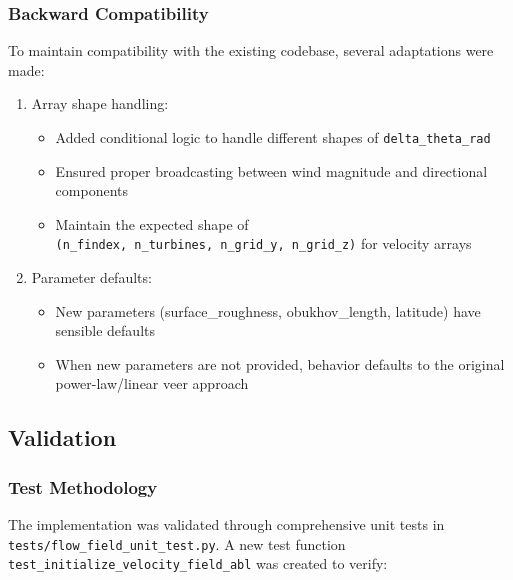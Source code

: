 \documentclass[
]{article}
\providecommand{\tightlist}{%
  \setlength{\itemsep}{0pt}\setlength{\parskip}{0pt}}
\begin{document}
\hypertarget{backward-compatibility}{%
\subsubsection{Backward Compatibility}\label{backward-compatibility}}

To maintain compatibility with the existing codebase, several
adaptations were made:

\begin{enumerate}
\def\labelenumi{\arabic{enumi}.}
\tightlist
\item
  Array shape handling:

  \begin{itemize}
  \tightlist
  \item
    Added conditional logic to handle different shapes of
    \texttt{delta\_theta\_rad}
  \item
    Ensured proper broadcasting between wind magnitude and directional
    components
  \item
    Maintain the expected shape of
    \texttt{(n\_findex,\ n\_turbines,\ n\_grid\_y,\ n\_grid\_z)} for
    velocity arrays
  \end{itemize}
\item
  Parameter defaults:

  \begin{itemize}
  \tightlist
  \item
    New parameters (surface\_roughness, obukhov\_length, latitude) have
    sensible defaults
  \item
    When new parameters are not provided, behavior defaults to the
    original power-law/linear veer approach
  \end{itemize}
\end{enumerate}

\hypertarget{validation}{%
\subsection{Validation}\label{validation}}

\hypertarget{test-methodology}{%
\subsubsection{Test Methodology}\label{test-methodology}}

The implementation was validated through comprehensive unit tests in
\texttt{tests/flow\_field\_unit\_test.py}. A new test function
\texttt{test\_initialize\_velocity\_field\_abl} was created to verify:
\end{document}
